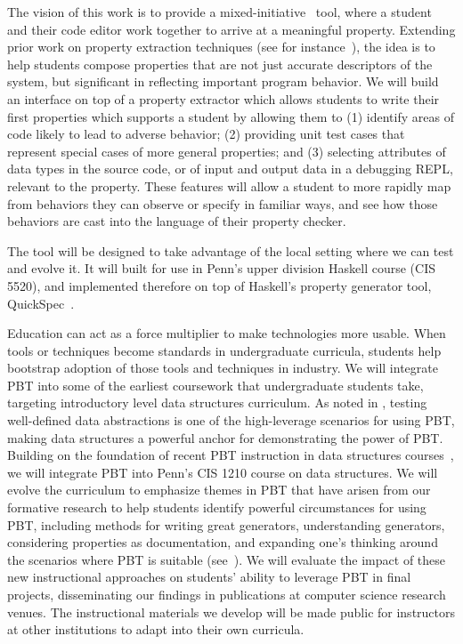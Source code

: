 The vision of this work is to provide a mixed-initiative~\cite{ref:allen1999mixed}
tool, where a student and their code editor work together to arrive at a
meaningful property. Extending prior work on property extraction techniques (see for
instance~\cite{ref:ammons2002mining, ref:le2018deep, ref:claessen2010quickspec,
smith_discovering_2017}), the idea is to help students compose properties that
are not just accurate descriptors of the system, but significant in reflecting
important program behavior. We will build an interface on top of a property
extractor which allows students to write their first properties which supports a
student by allowing them to (1) identify areas of code likely to lead to adverse behavior;
(2) providing unit test cases that represent special cases of more general
properties; and (3) selecting attributes of data types in the source code, or
of input and output data in a debugging REPL, relevant to the property. These
features will allow a student to more rapidly map from behaviors they can
observe or specify in familiar ways, and see how those behaviors are cast into
the language of their property checker.

The tool will be designed to take advantage of the local setting where we can
test and evolve it. It will built for use in Penn's upper division Haskell
course (CIS 5520), and implemented therefore on top of Haskell's property
generator tool, QuickSpec~\cite{ref:claessen2010quickspec}.

%
Education can act as a force multiplier to make technologies more usable.
When tools or techniques become standards in undergraduate curricula,
students help bootstrap adoption of those tools and techniques in industry. We will
integrate PBT into some of the earliest coursework that undergraduate students
take, targeting introductory level data structures
curriculum. As noted in , testing well-defined data
abstractions is one of the high-leverage scenarios for using PBT, making data
structures a powerful anchor for demonstrating the power of PBT. Building on the
foundation of recent PBT instruction in data structures
courses~\cite{wrenn2021using,nelson2021automated}, we will integrate PBT into
Penn's CIS 1210 course on data structures. We
will evolve the curriculum to emphasize themes in PBT that have arisen from our
formative research to help students identify powerful circumstances for
using PBT, including methods for writing great generators, understanding
generators, considering properties as documentation, and expanding one's
thinking around the scenarios where PBT is suitable
(see~). We will evaluate the impact of these new
instructional approaches on students' ability to leverage PBT in final projects,
disseminating our findings in publications at computer science research venues.
The instructional materials we develop will be made public for instructors at
other institutions to adapt into their own curricula.

